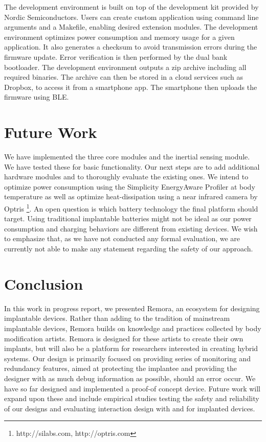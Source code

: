 \documentclass[runningheads,a4paper]{llncs}
\begin{document}
The development environment is built on top of the development kit provided by Nordic Semiconductors. Users can create custom application using command line arguments and a Makefile, enabling desired extension modules. The development environment optimizes power consumption and memory usage for a given application. It also generates a checksum to avoid transmission errors during the firmware update. Error verification is then performed by the dual bank bootloader. The development environment outputs a zip archive including all required binaries. The archive can then be stored in a cloud services such as Dropbox, to access it from a smartphone app. The smartphone then uploads the firmware using BLE.
\section{Future Work}
We have implemented the three core modules and the inertial sensing module. We have tested these for basic functionality. Our next steps are to add additional hardware modules and to thoroughly evaluate the existing ones. We intend to optimize power consumption using the Simplicity EnergyAware Profiler at body temperature as well as optimize heat-dissipation using a near infrared camera by Optris \footnote{http://silabs.com, http://optris.com}. An open question is which battery technology the final platform should target. Using traditional implantable batteries might not be ideal as our power consumption and charging behaviors are different from existing devices. We wish to emphasize that, as we have not conducted any formal evaluation, we are currently not able to make any statement regarding the safety of our approach.

\section{Conclusion}
In this work in progress report, we presented Remora, an ecosystem for designing implantable devices. Rather than adding to the tradition of mainstream implantable devices, Remora builds on knowledge and practices collected by body modification artists. Remora is designed for these artists to create their own implants, but will also be a platform for researchers interested in creating hybrid systems. Our design is primarily focused on providing series of monitoring and redundancy features, aimed at protecting the implantee and providing the designer with as much debug information as possible, should an error occur. We have so far designed and implemented a proof-of concept device. Future work will expand upon these and include empirical studies testing the safety and reliability of our designs and evaluating interaction design with and for implanted devices.
\end{document}
